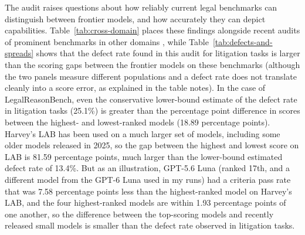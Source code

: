\documentclass[11pt]{article}
\newcommand{\labDefectiveShare}{13.4}
\newcommand{\lrbDefectiveShareLB}{25.1}
\newcommand{\labLeaderboardSpread}{81.59}
\newcommand{\lrbLeaderboardSpread}{18.89}
\newcommand{\labLeaderboardTopFourGap}{1.93}
\newcommand{\labLeaderboardLunaRank}{17}
\newcommand{\labLeaderboardLunaGap}{7.58}
\begin{document}
The audit raises questions about how reliably current legal benchmarks can distinguish between frontier models, and how accurately they can depict capabilities. Table~\ref{tab:cross-domain} places these findings alongside recent audits of prominent benchmarks in other domains \citep{northcuttLabelErrors,xiaoPolicyBench,openaiSwebench,terminalBenchAudit,surgeDayjob}, while Table~\ref{tab:defects-and-spreads} shows that the defect rate found in this audit for litigation tasks is larger than the scoring gaps between the frontier models on these benchmarks (although the two panels measure different populations and a defect rate does not translate cleanly into a score error, as explained in the table notes). In the case of LegalReasonBench, even the conservative lower-bound estimate of the defect rate in litigation tasks (\lrbDefectiveShareLB\%) is greater than the percentage point difference in scores between the highest- and lowest-ranked models (\lrbLeaderboardSpread{} percentage points). Harvey's LAB has been used on a much larger set of models, including some older models released in 2025, so the gap between the highest and lowest score on LAB is \labLeaderboardSpread{} percentage points, much larger than the lower-bound estimated defect rate of \labDefectiveShare\%. But as an illustration, GPT-5.6 Luna (ranked \labLeaderboardLunaRank{}th, and a different model from the GPT-6 Luna used in my runs) had a criteria pass rate that was \labLeaderboardLunaGap{} percentage points less than the highest-ranked model on Harvey's LAB, and the four highest-ranked models are within \labLeaderboardTopFourGap{} percentage points of one another, so the difference between the top-scoring models and recently released small models is smaller than the defect rate observed in litigation tasks.
\end{document}
